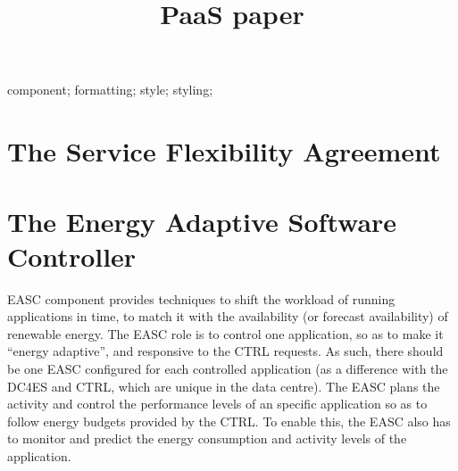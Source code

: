 \documentclass[10pt, conference, compsocconf]{IEEEtran}
\begin{document}
\title{PaaS paper}

\author{
\and
{}
}


\maketitle
\begin{abstract}

\end{abstract}

\begin{IEEEkeywords}
component; formatting; style; styling;

\end{IEEEkeywords}



\section{The Service Flexibility Agreement}

\section{The Energy Adaptive Software Controller}

EASC component provides techniques to shift the workload of running applications in time, to match it with the availability (or forecast availability) of renewable energy. The EASC role is to control one application, so as to make it “energy adaptive”, and responsive to the CTRL requests. As such, there should be one EASC configured for each controlled application (as a difference with the DC4ES and CTRL, which are unique in the data centre). The EASC plans the activity and control the performance levels of an specific application so as to follow energy budgets provided by the CTRL. To enable this, the EASC also has to monitor and predict the energy consumption and activity levels of the application.
\end{document}
